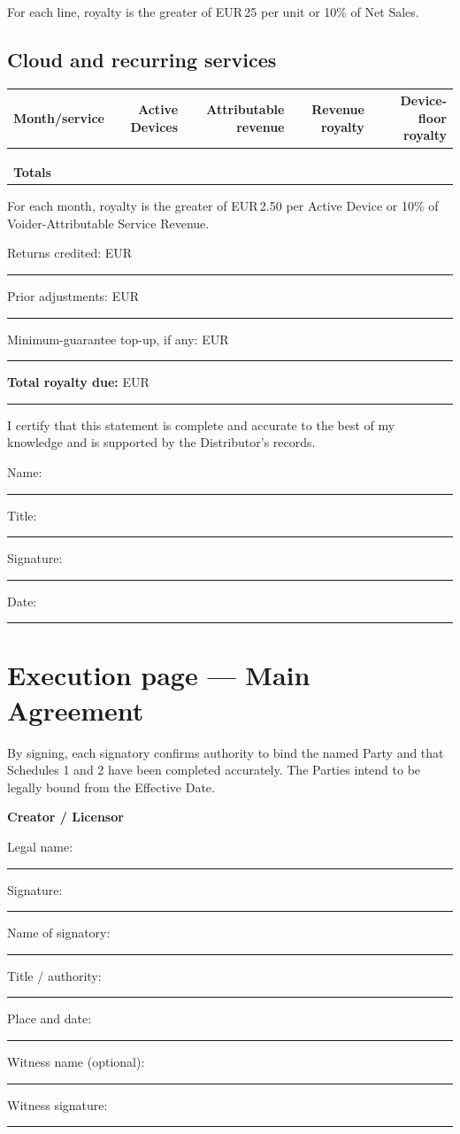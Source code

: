 \documentclass[11pt,a4paper]{article}
\newcommand{\blank}[1]{\rule{#1}{0.45pt}}
\newcommand{\money}{EUR\,}
\newcommand{\sigblock}[1]{%
  \vspace{4mm}
  {\large\bfseries #1}\par\medskip
  Legal name: \blank{0.72\linewidth}\par\vspace{5mm}
  Signature: \blank{0.73\linewidth}\par\vspace{5mm}
  Name of signatory: \blank{0.65\linewidth}\par\vspace{5mm}
  Title / authority: \blank{0.67\linewidth}\par\vspace{5mm}
  Place and date: \blank{0.69\linewidth}\par
}
\begin{document}
For each line, royalty is the greater of \money25 per unit or 10\% of Net Sales.

\subsection*{Cloud and recurring services}
\begin{tabularx}{\linewidth}{X r r r r}
\toprule
Month/service & Active Devices & Attributable revenue & Revenue royalty & Device-floor royalty\\
\midrule
 & & & & \\
\addlinespace[6mm]
 & & & & \\
\addlinespace[6mm]
 & & & & \\
\addlinespace[6mm]
\midrule
\textbf{Totals} & & & & \\
\bottomrule
\end{tabularx}

For each month, royalty is the greater of \money2.50 per Active Device or 10\% of Voider-Attributable Service Revenue.

Returns credited: \money\blank{35mm}\quad Prior adjustments: \money\blank{35mm}\par
Minimum-guarantee top-up, if any: \money\blank{35mm}\par
\textbf{Total royalty due:} \money\blank{50mm}\par

I certify that this statement is complete and accurate to the best of my knowledge and is supported by the Distributor's records.

Name: \blank{64mm}\quad Title: \blank{49mm}\par\vspace{5mm}
Signature: \blank{59mm}\quad Date: \blank{50mm}\par

\newpage
\section*{Execution page --- Main Agreement}

By signing, each signatory confirms authority to bind the named Party and that Schedules 1 and 2 have been completed accurately. The Parties intend to be legally bound from the Effective Date.

\sigblock{Creator / Licensor}

\vfill
Witness name (optional): \blank{50mm}\quad Witness signature: \blank{36mm}\par
\end{document}
